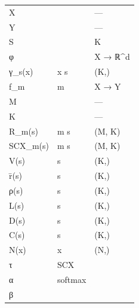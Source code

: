 \documentclass[
  12pt,
]{article}
\begin{document}
\begin{longtable}[]{@{}lll@{}}
\toprule\noalign{}
 &  &  \\
\midrule\noalign{}
\endhead
\bottomrule\noalign{}
\endlastfoot
X &  & --- \\
Y &  & --- \\
S &  & K  \\
φ &  & X → ℝ\^{}d \\
γ\_s(x) &  x  s  & (K,) \\
f\_m &  m  & X → Y \\
M &  & --- \\
K &  & --- \\
R\_m(s) &  m  s  & (M, K) \\
SCX\_m(s) &  m  s  & (M, K) \\
V(s) &  s  & (K,) \\
r̄(s) &  s  & (K,) \\
ρ(s) &  s  & (K,) \\
L(s) &  s  & (K,) \\
D(s) &  s  & (K,) \\
C(s) &  s  & (K,) \\
N(x) &  x  & (N,) \\
τ & SCX  &  \\
α &  softmax  &  \\
β &  &  \\
\end{longtable}
\end{document}
